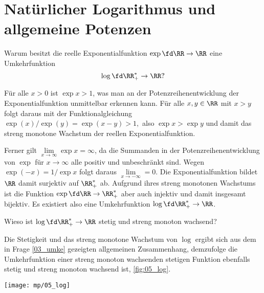\section{Natürlicher Logarithmus und allgemeine Potenzen}

\begin{frage}\label{05_exsu}
  Warum besitzt die reelle Exponentialfunktion $\exp\fd\RR\to\RR$ eine 
  Umkehrfunktion
  \[
  \log\fd \RR_+^{\ast} \to \RR \text{?}
  \]
\end{frage}

\begin{antwort}
  Für alle $x>0$ ist $\exp x>1$, was man an der 
  Potenzreihenentwicklung der Exponentialfunktion unmittelbar erkennen 
  kann. Für alle $x,y\in\RR$ mit $x>y$ folgt daraus mit der Funktionalgleichung 
  $\exp (x)/\exp (y)=\exp(x-y) > 1,$
  also $\exp x>\exp y$ und damit das streng monotone 
  Wachstum der reellen Exponentialfunktion.

  Ferner gilt $\lim\limits_{x\to \infty} \exp x=\infty$, 
  da die Summanden in der 
  Potenzreihenentwicklung von $\exp$ für $x\to\infty$ alle 
  positiv und unbeschränkt sind. 
  Wegen $\exp( -x )= 1/\exp x$ folgt daraus 
  $\lim\limits_{x\to-\infty}=0$. 
  Die Exponentialfunktion bildet $\RR$ damit surjektiv auf 
  $\RR_+^{\ast}$ 
  ab. Aufgrund ihres streng monotonen Wachstums ist die 
  Funktion $\exp\fd \RR\to\RR^*_+$ 
  aber auch injektiv und damit insgesamt bijektiv. 
  Es existiert also eine Umkehrfunktion 
  $\log \fd \RR_+^*\to \RR$.\AntEnd
\end{antwort} 

\begin{frage}
  Wieso ist $\log\fd\RR_+^* \to\RR$ stetig und streng monoton wachsend?
\end{frage} 

\begin{antwort}
  Die Stetigkeit und das streng monotone Wachstum von $\log$ ergibt sich 
  aus dem in Frage \ref{03_umke} gezeigten allgemeinen Zusammenhang, demzufolge 
  die Umkehrfunktion einer streng monoton wachsenden stetigen Funktion 
  ebenfalls stetig und streng monoton wachsend ist, 
  \sieheAbbildung\ref{fig:05_log}. \AntEnd

  \begin{center}
    \texttt{[image: mp/05\_log]}
    \label{fig:05_log}
  \end{center}

\end{antwort}

